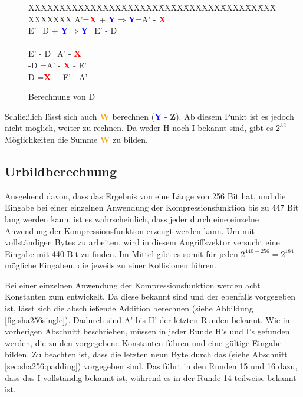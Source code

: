 \begin{figure}[!h]
  \begin{tabbing}
    XXXXXXXXXXXXXXXXXXXXX\=XX\=XX\=XXXXXX\=XXXX\=XX\=XX\=XXXXXXXX \kill
    \>A'\>=\>\textcolor{red}{\textbf{X}} + \textcolor{blue}{\textbf{Y}}\>$\Rightarrow$\>\textcolor{blue}{\textbf{Y}}\>=\>A' - \textcolor{red}{\textbf{X}}\\
    \>E'\>=\>D + \textcolor{blue}{\textbf{Y}}\>$\Rightarrow$\>\textcolor{blue}{\textbf{Y}}\>=\>E' - D\\
    \>~\\
    \>\>\>E' - D\>=\>A' - \textcolor{red}{\textbf{X}}\\
    \>\>\>-D    \>=\>A' - \textcolor{red}{\textbf{X}} - E'\\
    \>\>\>D     \>=\>\textcolor{red}{\textbf{X}} + E' - A'
  \end{tabbing}
  \caption{Berechnung von D}
  \label{eq:calcD}
\end{figure}

Schließlich lässt sich auch \textcolor{orange}{\textbf{W}} berechnen (\textcolor{blue}{\textbf{Y}} - \textcolor{Strong Green}{\textbf{Z}}). Ab diesem Punkt ist
es jedoch nicht möglich, weiter zu rechnen. Da weder H noch I bekannt sind, gibt es $2^{32}$ Möglichkeiten die Summe \textcolor{orange}{\textbf{W}} zu bilden.

\subsection{Urbildberechnung}
\label{sec:urbildberechnung}
Ausgehend davon, dass das Ergebnis von  eine Länge von 256 Bit hat, und die Eingabe bei einer einzelnen Anwendung der Kompressionsfunktion bis zu
447 Bit lang werden kann, ist es wahrscheinlich, dass jeder  durch eine einzelne Anwendung der Kompressionsfunktion erzeugt werden kann. Um mit vollständigen
Bytes zu arbeiten, wird in diesem Angriffsvektor versucht eine Eingabe mit 440 Bit zu finden. Im Mittel gibt es somit für jeden  $2^{440-256} = 2^{184}$
mögliche Eingaben, die jeweils zu einer Kollisionen führen.

Bei einer einzelnen Anwendung der Kompressionsfunktion werden acht Konstanten zum  entwickelt. Da diese bekannt sind und der  ebenfalls vorgegeben ist,
lässt sich die abschließende Addition berechnen (siehe Abbildung \ref{fig:sha256single}). Dadurch sind A' bis H' der letzten Runden bekannt. Wie im vorherigen
Abschnitt beschrieben, müssen in jeder Runde H's und I's gefunden werden, die zu den vorgegebene Konstanten führen und eine gültige Eingabe bilden. Zu beachten
ist, dass die letzten neun Byte durch das  (siehe Abschnitt \ref{sec:sha256:padding}) vorgegeben sind. Das führt in den Runden 15 und 16 dazu, dass
das I vollständig bekannt ist, während es in der Runde 14 teilweise bekannt ist.


